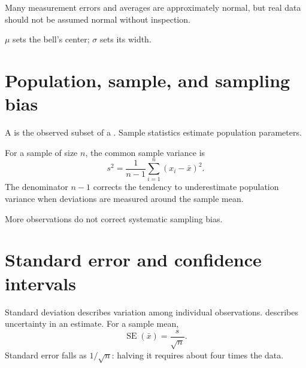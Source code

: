 \begin{mlfigure}
\end{mlfigure}

Many measurement errors and averages are approximately normal, but real data should not be assumed normal without inspection.

\begin{intuition}
$\mu$ sets the bell's center; $\sigma$ sets its width.
\end{intuition}

\section{Population, sample, and sampling bias}

A  is the observed subset of a . Sample statistics estimate population parameters.

For a sample of size $n$, the common sample variance is
\[
  s^2=\frac{1}{n-1}\sum_{i=1}^{n}(x_i-\bar{x})^2.
\]
The denominator $n-1$ corrects the tendency to underestimate population variance when deviations are measured around the sample mean.

\begin{pitfall}
More observations do not correct systematic sampling bias.
\end{pitfall}

\section{Standard error and confidence intervals}

Standard deviation describes variation among individual observations.  describes uncertainty in an estimate. For a sample mean,
\[
  \operatorname{SE}(\bar{x})=\frac{s}{\sqrt{n}}.
\]
Standard error falls as $1/\sqrt{n}$: halving it requires about four times the data.

